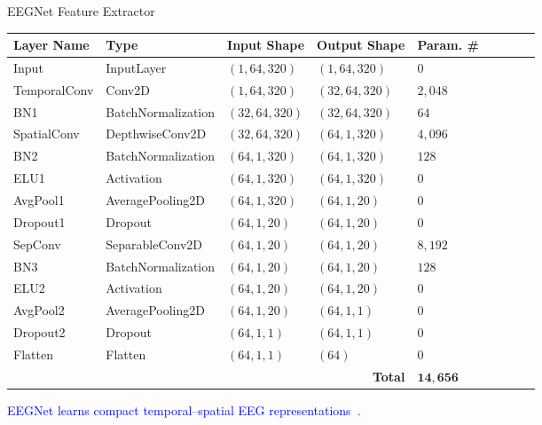 \documentclass[aspectratio=169]{beamer}
\let\oldcite\cite %
\renewcommand{\cite}[1]{{\tiny\oldcite{#1}}}
\begin{document}
\begin{frame}{EEGNet Feature Extractor}

\begin{table}
\scriptsize
\begin{tabularx}{\linewidth}{p{2.85cm}p{3.5cm}p{2.85cm}p{2.85cm}lcccc}
\toprule
\textbf{Layer Name} & \textbf{Type} & \textbf{Input Shape} & \textbf{Output Shape} & \textbf{Param. \#} \\
\midrule
Input        & InputLayer         & $(1,64,320)$   & $(1,64,320)$   & $0$ \\
TemporalConv & Conv2D             & $(1,64,320)$   & $(32,64,320)$  & $2{,}048$ \\
BN1          & BatchNormalization & $(32,64,320)$  & $(32,64,320)$  & $64$ \\
SpatialConv  & DepthwiseConv2D    & $(32,64,320)$  & $(64,1,320)$   & $4{,}096$ \\
BN2          & BatchNormalization & $(64,1,320)$   & $(64,1,320)$   & $128$ \\
ELU1         & Activation         & $(64,1,320)$   & $(64,1,320)$   & $0$ \\
AvgPool1     & AveragePooling2D   & $(64,1,320)$   & $(64,1,20)$    & $0$ \\
Dropout1     & Dropout            & $(64,1,20)$    & $(64,1,20)$    & $0$ \\
SepConv      & SeparableConv2D    & $(64,1,20)$    & $(64,1,20)$    & $8{,}192$ \\
BN3          & BatchNormalization & $(64,1,20)$    & $(64,1,20)$    & $128$ \\
ELU2         & Activation         & $(64,1,20)$    & $(64,1,20)$    & $0$ \\
AvgPool2     & AveragePooling2D   & $(64,1,20)$    & $(64,1,1)$     & $0$ \\
Dropout2     & Dropout            & $(64,1,1)$     & $(64,1,1)$     & $0$ \\
Flatten      & Flatten            & $(64,1,1)$     & $(64)$         & $0$ \\
\midrule
\multicolumn{4}{r}{\textbf{Total}} & $\mathbf{14{,}656}$ \\
\midrule

\end{tabularx}
\end{table}

\begin{center}
\textcolor{blue}{EEGNet learns compact temporal–spatial EEG representations~\cite{lawhern2018eegnet}.}
\end{center}
\end{frame}
\end{document}
